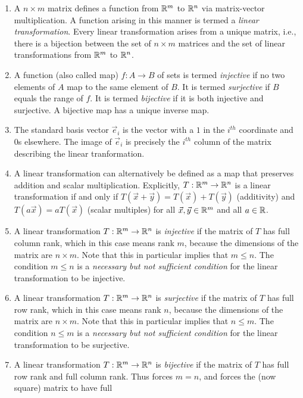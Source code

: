 \documentclass[10pt]{amsart}
\begin{document}
\begin{enumerate}
\item A $n \times m$ matrix defines a function from $\mathbb{R}^m$ to $\mathbb{R}^n$
  via matrix-vector multiplication. A function arising in this manner
  is termed a {\em linear transformation}. Every linear transformation
  arises from a unique matrix, i.e., there is a bijection between the
  set of $n \times m$ matrices and the set of linear transformations
  from $\mathbb{R}^m$ to $\mathbb{R}^n$.
\item A function (also called map) $f: A \to B$ of sets is termed {\em
  injective} if no two elements of $A$ map to the same element of
  $B$. It is termed {\em surjective} if $B$ equals the range of
  $f$. It is termed {\em bijective} if it is both injective and
  surjective. A bijective map has a unique inverse map.
\item The standard basis vector $\vec{e}_i$ is the vector with a $1$
  in the $i^{th}$ coordinate and $0$s elsewhere. The image of
  $\vec{e}_i$ is precisely the $i^{th}$ column of the matrix
  describing the linear tranformation.
\item A linear transformation can alternatively be defined as a map
  that preserves addition and scalar multiplication. Explicitly, $T:
  \mathbb{R}^m \to \mathbb{R}^n$ is a linear transformation if and only if $T(\vec{x}
  + \vec{y}) = T(\vec{x}) + T(\vec{y})$ (additivity) and $T(a\vec{x})
  = aT(\vec{x})$ (scalar multiples) for all $\vec{x},\vec{y} \in \mathbb{R}^m$
  and all $a \in \mathbb{R}$.
\item A linear transformation $T:\mathbb{R}^m \to \mathbb{R}^n$ is {\em injective} if
  the matrix of $T$ has full column rank, which in this case means
  rank $m$, because the dimensions of the matrix are $n \times
  m$. Note that this in particular implies that $m \le n$. The
  condition $m \le n$ is a {\em necessary but not sufficient
    condition} for the linear transformation to be injective.
\item A linear transformation $T:\mathbb{R}^m \to \mathbb{R}^n$ is {\em surjective} if
  the matrix of $T$ has full row rank, which in this case means rank
  $n$, because the dimensions of the matrix are $n \times m$. Note
  that this in particular implies that $n \le m$. The condition $n \le
  m$ is a {\em necessary but not sufficient condition} for the linear
  transformation to be surjective.
\item A linear transformation $T:\mathbb{R}^m \to \mathbb{R}^n$ is {\em bijective} if
  the matrix of $T$ has full row rank and full column rank. Thus
  forces $m = n$, and forces the (now square) matrix to have full

\end{enumerate}
\end{document}

